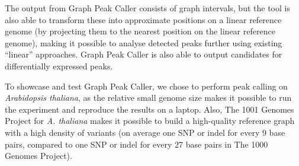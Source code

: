 \documentclass[10pt,letterpaper]{article}
\begin{document}
\begin{figure}
\end{figure}

The output from Graph Peak Caller consists of graph intervals, but the tool is also able to transform these into approximate positions on a linear reference genome (by projecting them to the nearest position on the linear reference genome), making it possible to analyse detected peaks further using existing “linear” approaches. Graph Peak Caller is also able to output candidates for differentially expressed peaks.

To showcase and test Graph Peak Caller, we chose to perform peak calling on \emph{Arabidopsis thaliana}, as the relative small genome size makes it possible to run the experiment and reproduce the results on a laptop. Also, The 1001 Genomes Project for \emph{A. thaliana} makes it possible to build a high-quality reference graph with a high density of variants (on average one SNP or indel for every 9 base pairs, compared to one SNP or indel for every 27 base pairs in The 1000 Genomes Project). 
\end{document}
